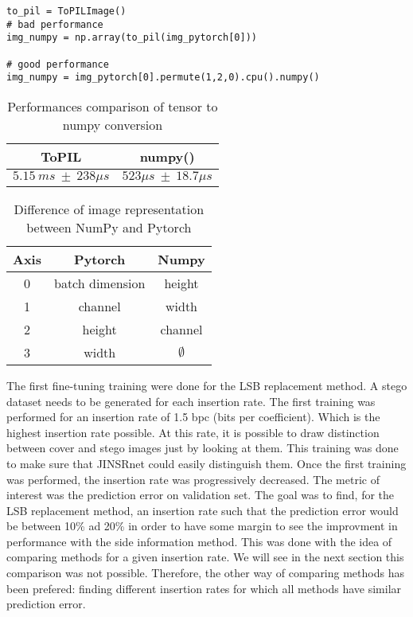\documentclass[12pt]{article}
\begin{document}
\begin{lstlisting}[caption={Conversion of pytorch tensors into numpy images}, label={lst:example}]
to_pil = ToPILImage()
# bad performance
img_numpy = np.array(to_pil(img_pytorch[0]))

# good performance
img_numpy = img_pytorch[0].permute(1,2,0).cpu().numpy() 
\end{lstlisting}

\begin{table}[H]
    \centering
    \begin{tabular}{|c|c|}
        \hline
        ToPIL & numpy()\\
        \hline
        $5.15\ ms\ \pm\ 238 \mu s$  & $523 \mu s\ \pm\ 18.7 \mu s  $\\
        \hline
    \end{tabular}
    \caption[Performances comparison of tensor to numpy conversion]{Performances comparison of tensor to numpy conversion}
    \label{tab:torch2np}
\end{table}

\begin{table}[H]
    \centering
\begin{tabular}{|c|c|c|}
    \hline
    Axis & Pytorch & Numpy \\
    \hline
    0 & batch dimension & height \\
    \hline
    1 & channel & width\\
    \hline
    2 & height & channel\\
    \hline
    3 & width & $\emptyset$\\
    \hline
\end{tabular}    
\caption[Difference of image representation between NumPy and Pytorch]{Difference of image representation between NumPy and Pytorch}
\end{table}
The first fine-tuning training were done for the LSB replacement method. A stego dataset needs to be generated for each insertion rate. The first training was performed for an insertion rate of 1.5 bpc (bits per coefficient). Which is the highest insertion rate possible. At this rate, it is possible to draw distinction between cover and stego images just by looking at them. This training was done to make sure that JINSRnet could easily distinguish them. Once the first training was performed, the insertion rate was progressively decreased. The metric of interest was the prediction error on validation set. The goal was to find, for the LSB replacement method, an insertion rate such that the prediction error would be between 10\% ad 20\% in order to have some margin to see the improvment in performance with the side information method. This was done with the idea of comparing methods for a given insertion rate. We will see in the next section this comparison was not possible. Therefore, the other way of comparing methods has been prefered: finding different insertion rates for which all methods have similar prediction error.
\end{document}
